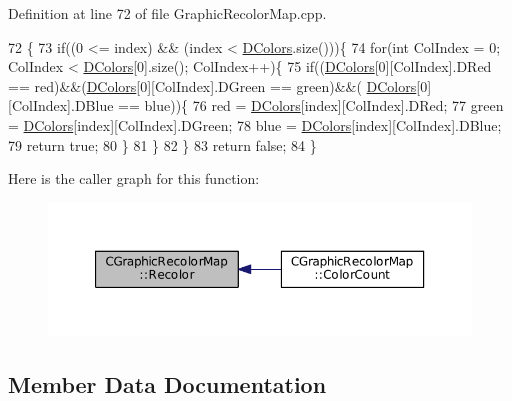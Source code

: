Definition at line 72 of file Graphic\+Recolor\+Map.\+cpp.


\begin{DoxyCode}
72                                                                                    \{
73     \textcolor{keywordflow}{if}((0 <= index) && (index < \hyperlink{classCGraphicRecolorMap_a9dea9a9e96e4465a53a40c4a34cebf71}{DColors}.size()))\{
74         \textcolor{keywordflow}{for}(\textcolor{keywordtype}{int} ColIndex = 0; ColIndex < \hyperlink{classCGraphicRecolorMap_a9dea9a9e96e4465a53a40c4a34cebf71}{DColors}[0].size(); ColIndex++)\{
75             \textcolor{keywordflow}{if}((\hyperlink{classCGraphicRecolorMap_a9dea9a9e96e4465a53a40c4a34cebf71}{DColors}[0][ColIndex].DRed == red)&&(\hyperlink{classCGraphicRecolorMap_a9dea9a9e96e4465a53a40c4a34cebf71}{DColors}[0][ColIndex].DGreen == green)&&(
      \hyperlink{classCGraphicRecolorMap_a9dea9a9e96e4465a53a40c4a34cebf71}{DColors}[0][ColIndex].DBlue == blue))\{
76                 red = \hyperlink{classCGraphicRecolorMap_a9dea9a9e96e4465a53a40c4a34cebf71}{DColors}[index][ColIndex].DRed;
77                 green = \hyperlink{classCGraphicRecolorMap_a9dea9a9e96e4465a53a40c4a34cebf71}{DColors}[index][ColIndex].DGreen;
78                 blue = \hyperlink{classCGraphicRecolorMap_a9dea9a9e96e4465a53a40c4a34cebf71}{DColors}[index][ColIndex].DBlue;
79                 \textcolor{keywordflow}{return} \textcolor{keyword}{true};
80             \}
81         \}
82     \}
83     \textcolor{keywordflow}{return} \textcolor{keyword}{false};
84 \}
\end{DoxyCode}
Here is the caller graph for this function\+:\nopagebreak
\begin{figure}[H]
\begin{center}
\leavevmode
\includegraphics[width=350pt]{classCGraphicRecolorMap_a338087373145b89a29902b50276358d1_icgraph}
\end{center}
\end{figure}


\subsection{Member Data Documentation}
\hypertarget{classCGraphicRecolorMap_a9dea9a9e96e4465a53a40c4a34cebf71}{}\label{classCGraphicRecolorMap_a9dea9a9e96e4465a53a40c4a34cebf71} 
